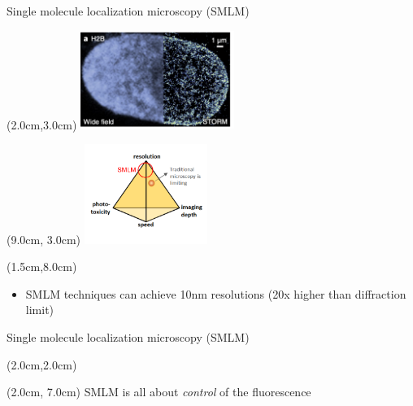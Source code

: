 \documentclass{beamer}					%
\begin{document}
\begin{frame}{Single molecule localization microscopy (SMLM)}

\begin{textblock*}{5cm}(2.0cm,3.0cm)
\includegraphics[width=5cm]{../../postdoc/sartorius/media/STORM.png}
\end{textblock*}

\begin{textblock*}{4cm}(9.0cm, 3.0cm)
\includegraphics[width=4cm]{../../postdoc/sartorius/media/Tradeoff-SMLM.png}
\end{textblock*}

\begin{textblock*}{10cm}(1.5cm,8.0cm)
\begin{itemize}
\item SMLM techniques can achieve 10nm resolutions (20x higher than diffraction limit) 
\end{itemize}
\end{textblock*}

\end{frame}

\begin{frame}{Single molecule localization microscopy (SMLM)}

\begin{textblock*}{10cm}(2.0cm,2.0cm)
\end{textblock*}

\begin{textblock*}{10cm}(2.0cm, 7.0cm)
SMLM is all about \emph{control} of the fluorescence 
\end{textblock*}

\end{frame}
\end{document}

